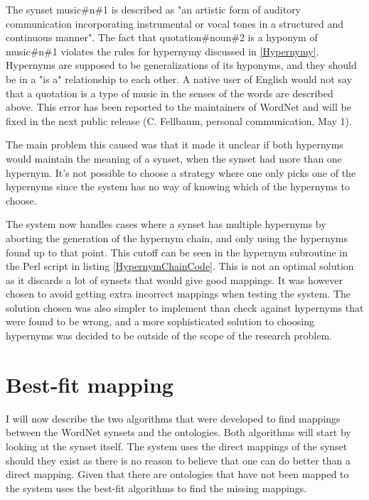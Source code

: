 
The synset music\#n\#1 is described as "an artistic form of auditory communication incorporating instrumental or vocal tones in a structured and continuous manner".
The fact that quotation\#noun\#2 is a hyponym of music\#n\#1 violates the rules for hypernymy discussed in \ref{Hypernymy}.
Hypernyms are supposed to be generalizations of its hyponyms,
and they should be in a "is a" relationship to each other.
A native user of English would not say that a quotation is a type of music in the senses of the words are described above.
This error has been reported to the maintainers of WordNet and will be fixed in the next public release (C. Fellbaum, personal communication, May 1).

The main problem this caused was that it made it unclear if both hypernyms would maintain the meaning of a synset,
when the synset had more than one hypernym.
It's not possible to choose a strategy where one only picks one of the hypernyms since the system has no way of
knowing which of the hypernyms to choose.

The system now handles cases where a synset has multiple hypernyms by aborting the generation of the hypernym chain,
and only using the hypernyms found up to that point.
This cutoff can be seen in the hypernym subroutine in the Perl script in listing \ref{HypernymChainCode}.
This is not an optimal solution as it discards a lot of synsets that would give good mappings.
It was however chosen to avoid getting extra incorrect mappings when testing the system.
The solution chosen was also simpler to implement than check against hypernyms that were found to be wrong,
and a more sophisticated solution to choosing hypernyms was decided to be outside of the scope of the research problem.

\section{Best-fit mapping}
\label{BestFitMapping}
I will now describe the two algorithms that were developed to find mappings between the WordNet synsets and the ontologies.
Both algorithms will start by looking at the synset itself.
The system uses the direct mappings of the synset should they exist as there is no reason to believe that one can do better than a
direct mapping.
Given that there are ontologies that have not been mapped to the system uses the best-fit algorithms to find the missing mappings.

